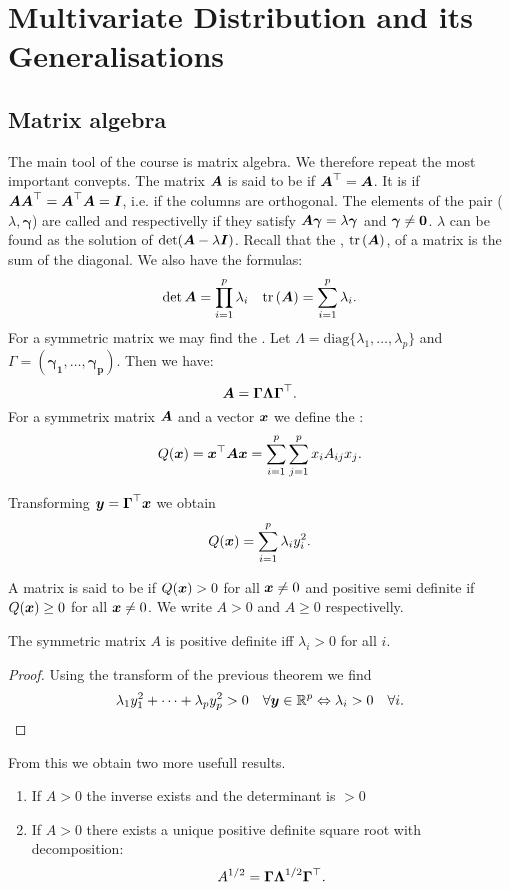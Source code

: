 \section{Multivariate Distribution and its Generalisations}
\subsection{Matrix algebra}

The main tool of the course is matrix algebra. We therefore repeat the most important convepts. The matrix $\boldsymbol{A}$ is said to be  if $\boldsymbol{A}^\top=\boldsymbol{A}$. It is  if $\boldsymbol{A}\boldsymbol{A}^\top=\boldsymbol{A}^\top\boldsymbol{A}=\boldsymbol{I}$, i.e. if the columns are orthogonal. The elements of the pair ($\lambda, \boldsymbol{\gamma}$) are called  and  respectivelly if they satisfy $\boldsymbol{A}\boldsymbol{\gamma}=\lambda \boldsymbol{\gamma}$ and $\boldsymbol{\gamma}\ne \boldsymbol{0}$. $\lambda$ can be found as the solution of $\det(\boldsymbol{A}-\lambda \boldsymbol{I})$. Recall that the , $\mathrm{tr}\left(\boldsymbol{A}\right)$, of a matrix is the sum of the diagonal. We also have the formulas:
$$
    \det{\boldsymbol{A}} = \prod_{i=1}^p \lambda_i
    \quad
    \mathrm{tr}\left(\boldsymbol{A}\right) = \sum_{i=1}^p \lambda_i.
$$
For a symmetric matrix we may find the . Let $\Lambda = \textrm{diag}\{\lambda_1, \dots, \lambda_p\}$ and $\Gamma = (\boldsymbol{\gamma_1}, \dots, \boldsymbol{\gamma_p})$. Then we have:
$$
    \boldsymbol{A}=\boldsymbol{\Gamma}\boldsymbol{\Lambda}\boldsymbol{\Gamma}^\top.
$$
For a symmetrix matrix $\boldsymbol{A}$ and a vector $\boldsymbol{x}$ we define the :
$$
    Q(\boldsymbol{x}) = \boldsymbol{x}^\top \boldsymbol{A} \boldsymbol{x} = \sum_{i=1}^p\sum_{j=1}^p x_i A_{ij} x_j.
$$
\begin{theorem}
    Transforming $\boldsymbol{y}=\boldsymbol{\Gamma}^\top\boldsymbol{x}$ we obtain 
    $$
        Q(\boldsymbol{x}) = \sum_{i=1}^p \lambda_i y_i^2.
    $$
\end{theorem}
A matrix is said to be  if $Q(\boldsymbol{x})>0$ for all $\boldsymbol{x}\ne0$ and positive semi definite if $Q(\boldsymbol{x})\geq0$ for all $\boldsymbol{x}\ne0$. We write $A>0$ and $A\geq 0$ respectivelly. 
\begin{theorem}
    The symmetric matrix $A$ is positive definite iff $\lambda_i > 0$ for all $i$.
\end{theorem}
\begin{proof}
    Using the transform of the previous theorem we find 
    $$
        \lambda_1 y_1^2 + \dots + \lambda_p y_p^2 > 0 \quad\forall \boldsymbol{y}\in\mathbb{R}^p \Leftrightarrow \lambda_i > 0 \quad\forall i. 
    $$
\end{proof}
From this we obtain two more usefull results. 
\begin{enumerate}
    \item If $A>0$ the inverse exists and the determinant is $>0$
    \item If $A>0$ there exists a unique positive definite square root with decomposition:
    $$
        A^{1/2} = \boldsymbol{\Gamma}\boldsymbol{\Lambda}^{1/2}\boldsymbol{\Gamma}^\top.
    $$
\end{enumerate}

